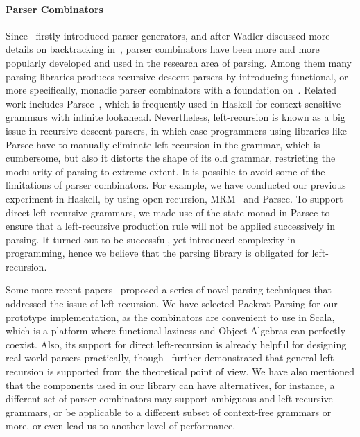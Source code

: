 \paragraph*{Parser Combinators} Since~\cite{burge1975} firstly
introduced parser generators, and after Wadler discussed more details
on backtracking in~\cite{Wadler1985}, parser combinators have been
more and more popularly developed and used in the research area of
parsing. Among them many parsing libraries produces recursive descent
parsers by introducing functional, or more specifically, monadic
parser combinators with a foundation on~\cite{nott237}. Related work
includes Parsec~\cite{Leijen2001}, which is frequently used in Haskell
for context-sensitive grammars with infinite lookahead. Nevertheless,
left-recursion is known as a big issue in recursive descent parsers,
in which case programmers using libraries like Parsec have to manually
eliminate left-recursion in the grammar, which is cumbersome, but also
it distorts the shape of its old grammar, restricting the modularity
of parsing to extreme extent. It is possible to avoid some of  
 the limitations of parser combinators. 
For example, we have
conducted our previous experiment in Haskell, by using open recursion,
MRM~\cite{Oliveira2015} and Parsec. To support direct left-recursive
grammars, we made use of the state monad in Parsec to ensure that a
left-recursive production rule will not be applied successively in
parsing. It turned out to be successful, yet introduced complexity in
programming, hence we believe that the parsing library is obligated
for left-recursion.

Some more recent papers~\cite{Ford2002,Might2011,Frost2008}
 proposed a series of
novel parsing techniques that addressed the issue
of left-recursion. We have selected Packrat
Parsing for our prototype implementation, as the combinators are
convenient to use in Scala, which is a platform where functional
laziness and Object Algebras can perfectly coexist. Also, its support
for direct left-recursion is already helpful for designing real-world
parsers practically, though~\cite{warth2008} further demonstrated that
general left-recursion is supported from the theoretical point of
view. We have also mentioned that the components used in our library
can have alternatives, for instance, a different set of parser
combinators may support ambiguous and left-recursive grammars, or be
applicable to a different subset of context-free grammars or more, or
even lead us to another level of performance.


